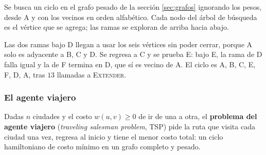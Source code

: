 \documentclass[11pt,letterpaper]{article}
\begin{document}
\begin{ejemplo}
  \label{ej:hamilton-traza}
  Se busca un ciclo en el grafo pesado de la sección \ref{sec:grafos}
  ignorando los pesos, desde A y con los vecinos en orden
  alfabético. Cada nodo del árbol de búsqueda es el vértice que se
  agrega; las ramas se exploran de arriba hacia abajo.
  \begin{center}
  \end{center}
  Las dos ramas bajo D llegan a usar los seis vértices sin poder
  cerrar, porque A solo es adyacente a B, C y D. Se regresa a C y se
  prueba E: bajo E, la rama de D falla igual y la de F termina en D,
  que sí es vecino de A. El ciclo es A, B, C, E, F, D, A, tras $13$
  llamadas a \textsc{Extender}.
\end{ejemplo}


\subsubsection*{El agente viajero}

\begin{definicion}
  Dadas $n$ ciudades y el costo $w(u, v) \ge 0$ de ir de una a otra,
  el \textbf{problema del agente viajero} (\textit{traveling salesman
  problem}, TSP) pide la ruta que visita cada ciudad una vez, regresa
  al inicio y tiene el menor costo total: un ciclo hamiltoniano de
  costo mínimo en un grafo completo y pesado.
\end{definicion}
\end{document}
